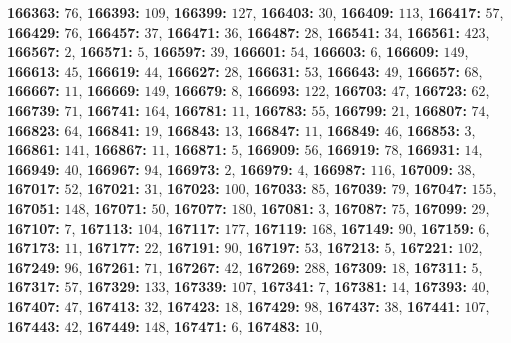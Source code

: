 \textsf{\bfseries 166363:} $76$, \textsf{\bfseries 166393:} $109$, \textsf{\bfseries 166399:} $127$, \textsf{\bfseries 166403:} $30$, \textsf{\bfseries 166409:} $113$, \textsf{\bfseries 166417:} $57$, \textsf{\bfseries 166429:} $76$, \textsf{\bfseries 166457:} $37$, \textsf{\bfseries 166471:} $36$, \textsf{\bfseries 166487:} $28$, \textsf{\bfseries 166541:} $34$, \textsf{\bfseries 166561:} $423$, \textsf{\bfseries 166567:} $2$, \textsf{\bfseries 166571:} $5$, \textsf{\bfseries 166597:} $39$, \textsf{\bfseries 166601:} $54$, \textsf{\bfseries 166603:} $6$, \textsf{\bfseries 166609:} $149$, \textsf{\bfseries 166613:} $45$, \textsf{\bfseries 166619:} $44$, \textsf{\bfseries 166627:} $28$, \textsf{\bfseries 166631:} $53$, \textsf{\bfseries 166643:} $49$, \textsf{\bfseries 166657:} $68$, \textsf{\bfseries 166667:} $11$, \textsf{\bfseries 166669:} $149$, \textsf{\bfseries 166679:} $8$, \textsf{\bfseries 166693:} $122$, \textsf{\bfseries 166703:} $47$, \textsf{\bfseries 166723:} $62$, \textsf{\bfseries 166739:} $71$, \textsf{\bfseries 166741:} $164$, \textsf{\bfseries 166781:} $11$, \textsf{\bfseries 166783:} $55$, \textsf{\bfseries 166799:} $21$, \textsf{\bfseries 166807:} $74$, \textsf{\bfseries 166823:} $64$, \textsf{\bfseries 166841:} $19$, \textsf{\bfseries 166843:} $13$, \textsf{\bfseries 166847:} $11$, \textsf{\bfseries 166849:} $46$, \textsf{\bfseries 166853:} $3$, \textsf{\bfseries 166861:} $141$, \textsf{\bfseries 166867:} $11$, \textsf{\bfseries 166871:} $5$, \textsf{\bfseries 166909:} $56$, \textsf{\bfseries 166919:} $78$, \textsf{\bfseries 166931:} $14$, \textsf{\bfseries 166949:} $40$, \textsf{\bfseries 166967:} $94$, \textsf{\bfseries 166973:} $2$, \textsf{\bfseries 166979:} $4$, \textsf{\bfseries 166987:} $116$, \textsf{\bfseries 167009:} $38$, \textsf{\bfseries 167017:} $52$, \textsf{\bfseries 167021:} $31$, \textsf{\bfseries 167023:} $100$, \textsf{\bfseries 167033:} $85$, \textsf{\bfseries 167039:} $79$, \textsf{\bfseries 167047:} $155$, \textsf{\bfseries 167051:} $148$, \textsf{\bfseries 167071:} $50$, \textsf{\bfseries 167077:} $180$, \textsf{\bfseries 167081:} $3$, \textsf{\bfseries 167087:} $75$, \textsf{\bfseries 167099:} $29$, \textsf{\bfseries 167107:} $7$, \textsf{\bfseries 167113:} $104$, \textsf{\bfseries 167117:} $177$, \textsf{\bfseries 167119:} $168$, \textsf{\bfseries 167149:} $90$, \textsf{\bfseries 167159:} $6$, \textsf{\bfseries 167173:} $11$, \textsf{\bfseries 167177:} $22$, \textsf{\bfseries 167191:} $90$, \textsf{\bfseries 167197:} $53$, \textsf{\bfseries 167213:} $5$, \textsf{\bfseries 167221:} $102$, \textsf{\bfseries 167249:} $96$, \textsf{\bfseries 167261:} $71$, \textsf{\bfseries 167267:} $42$, \textsf{\bfseries 167269:} $288$, \textsf{\bfseries 167309:} $18$, \textsf{\bfseries 167311:} $5$, \textsf{\bfseries 167317:} $57$, \textsf{\bfseries 167329:} $133$, \textsf{\bfseries 167339:} $107$, \textsf{\bfseries 167341:} $7$, \textsf{\bfseries 167381:} $14$, \textsf{\bfseries 167393:} $40$, \textsf{\bfseries 167407:} $47$, \textsf{\bfseries 167413:} $32$, \textsf{\bfseries 167423:} $18$, \textsf{\bfseries 167429:} $98$, \textsf{\bfseries 167437:} $38$, \textsf{\bfseries 167441:} $107$, \textsf{\bfseries 167443:} $42$, \textsf{\bfseries 167449:} $148$, \textsf{\bfseries 167471:} $6$, \textsf{\bfseries 167483:} $10$, 

